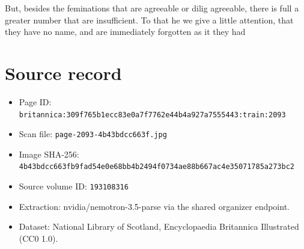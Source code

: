 \documentclass{article}
\begin{document}
But, besides the feminations that are agreeable or dilig agreeable, there is full a greater number that are insufficient. To that he we give a little attention, that they have no name, and are immediately forgotten as it they had

\section*{Source record}
\begin{itemize}
\item Page ID: \texttt{britannica:309f765b1ecc83e0a7f7762e44b4a927a7555443:train:2093}
\item Scan file: \texttt{page-2093-4b43bdcc663f.jpg}
\item Image SHA-256: \texttt{4b43bdcc663fb9fad54e0e68bb4b2494f0734ae88b667ac4e35071785a273bc2}
\item Source volume ID: \texttt{193108316}
\item Extraction: nvidia/nemotron-3.5-parse via the shared organizer endpoint.
\item Dataset: National Library of Scotland, Encyclopaedia Britannica Illustrated (CC0 1.0).
\end{itemize}
\end{document}
